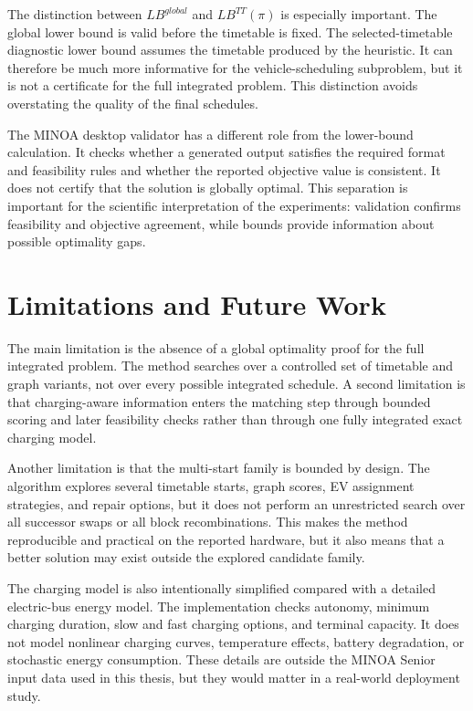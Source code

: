 The distinction between \(LB^{global}\) and \(LB^{TT}(\pi)\) is especially
important.  The global lower bound is valid before the timetable is fixed.  The
selected-timetable diagnostic lower bound assumes the timetable produced by the
heuristic.  It can therefore be much more informative for the vehicle-scheduling
subproblem, but it is not a certificate for the full integrated problem.  This
distinction avoids overstating the quality of the final schedules.

The MINOA desktop validator has a different role from the lower-bound calculation.
It checks whether a generated output satisfies the required format and
feasibility rules and whether the reported objective value is consistent.  It
does not certify that the solution is globally optimal.  This separation is
important for the scientific interpretation of the experiments: validation
confirms feasibility and objective agreement, while bounds provide information
about possible optimality gaps.

\section{Limitations and Future Work}
\label{sec:discussion-limitations}

The main limitation is the absence of a global optimality proof for the full
integrated problem.  The method searches over a controlled set of timetable and
graph variants, not over every possible integrated schedule.  A second
limitation is that charging-aware information enters the matching step through
bounded scoring and later feasibility checks rather than through one fully
integrated exact charging model.

Another limitation is that the multi-start family is bounded by design.  The
algorithm explores several timetable starts, graph scores, EV assignment
strategies, and repair options, but it does not perform an unrestricted search
over all successor swaps or all block recombinations.  This makes the method
reproducible and practical on the reported hardware, but it also means that a
better solution may exist outside the explored candidate family.

The charging model is also intentionally simplified compared with a detailed
electric-bus energy model.  The implementation checks autonomy, minimum
charging duration, slow and fast charging options, and terminal capacity.  It
does not model nonlinear charging curves, temperature effects, battery
degradation, or stochastic energy consumption.  These details are outside the
MINOA Senior input data used in this thesis, but they would matter in a
real-world deployment study.

